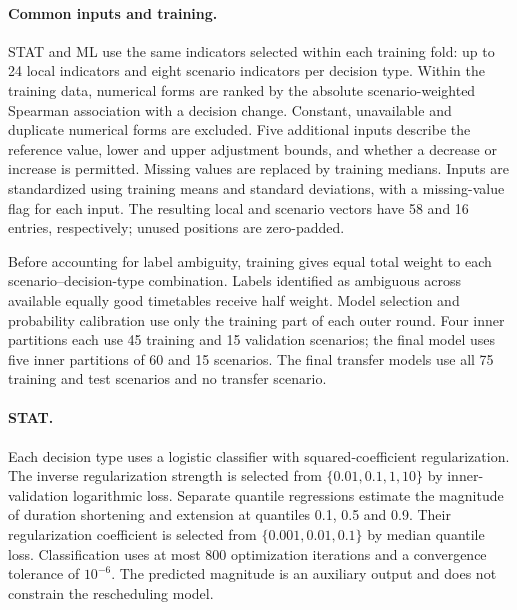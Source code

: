 \begingroup
\paragraph{Common inputs and training.}
STAT and ML use the same indicators selected within each training fold: up to 24 local indicators and eight scenario indicators per decision type. Within the training data, numerical forms are ranked by the absolute scenario-weighted Spearman association with a decision change. Constant, unavailable and duplicate numerical forms are excluded. Five additional inputs describe the reference value, lower and upper adjustment bounds, and whether a decrease or increase is permitted. Missing values are replaced by training medians. Inputs are standardized using training means and standard deviations, with a missing-value flag for each input. The resulting local and scenario vectors have 58 and 16 entries, respectively; unused positions are zero-padded.

Before accounting for label ambiguity, training gives equal total weight to each scenario--decision-type combination. Labels identified as ambiguous across available equally good timetables receive half weight. Model selection and probability calibration use only the training part of each outer round. Four inner partitions each use 45 training and 15 validation scenarios; the final model uses five inner partitions of 60 and 15 scenarios. The final transfer models use all 75 training and test scenarios and no transfer scenario.

\paragraph{STAT.}
Each decision type uses a logistic classifier with squared-coefficient regularization. The inverse regularization strength is selected from $\{0.01,0.1,1,10\}$ by inner-validation logarithmic loss. Separate quantile regressions estimate the magnitude of duration shortening and extension at quantiles 0.1, 0.5 and 0.9. Their regularization coefficient is selected from $\{0.001,0.01,0.1\}$ by median quantile loss. Classification uses at most 800 optimization iterations and a convergence tolerance of $10^{-6}$. The predicted magnitude is an auxiliary output and does not constrain the rescheduling model.

